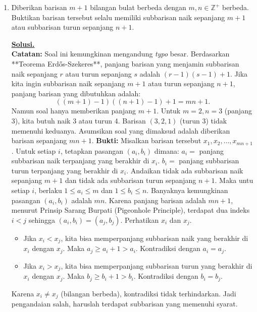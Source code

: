 \documentclass[12pt,twoside]{article}
\newenvironment{solution}
{
	\par\noindent\textbf{\underline{Solusi.}}\\
}
{
	\par
}
\begin{document}
\begin{enumerate}
  \item Diberikan barisan $m+1$ bilangan bulat berbeda dengan $m,n \in \mathbb{Z}^+$ berbeda.
        Buktikan barisan tersebut selalu memiliki subbarisan naik sepanjang $m+1$ atau subbarisan turun sepanjang $n+1$.
        \begin{solution}
          \textbf{Catatan:} Soal ini kemungkinan mengandung \textit{typo} besar.
          Berdasarkan **Teorema Erd\H{o}s-Szekeres**, panjang barisan yang menjamin subbarisan naik sepanjang $r$ atau turun sepanjang $s$ adalah $(r-1)(s-1) + 1$.
          Jika kita ingin subbarisan naik sepanjang $m+1$ atau turun sepanjang $n+1$, panjang barisan yang dibutuhkan adalah:
          \[ ((m+1)-1)((n+1)-1) + 1 = mn + 1. \]
          Namun soal hanya memberikan panjang $m+1$. Untuk $m=2, n=3$ (panjang 3), kita butuh naik 3 atau turun 4. Barisan $(3,2,1)$ (turun 3) tidak memenuhi keduanya.
          Asumsikan soal yang dimaksud adalah diberikan barisan sepanjang $mn+1$.
          \textbf{Bukti:}
          Misalkan barisan tersebut $x_1, x_2, \dots, x_{mn+1}$.
          Untuk setiap $i$, tetapkan pasangan $(a_i, b_i)$ dimana:
          $a_i =$ panjang subbarisan naik terpanjang yang berakhir di $x_i$.
          $b_i =$ panjang subbarisan turun terpanjang yang berakhir di $x_i$.
          Andaikan tidak ada subbarisan naik sepanjang $m+1$ dan tidak ada subbarisan turun sepanjang $n+1$.
          Maka untu setiap $i$, berlaku $1 \le a_i \le m$ dan $1 \le b_i \le n$.
          Banyaknya kemungkinan pasangan $(a_i, b_i)$ adalah $mn$.
          Karena panjang barisan adalah $mn+1$, menurut Prinsip Sarang Burpati (Pigeonhole Principle), terdapat dua indeks $i < j$ sehingga $(a_i, b_i) = (a_j, b_j)$.
          Perhatikan $x_i$ dan $x_j$.
          \begin{itemize}
            \item Jika $x_i < x_j$, kita bisa memperpanjang subbarisan naik yang berakhir di $x_i$ dengan $x_j$. Maka $a_j \ge a_i + 1 > a_i$. Kontradiksi dengan $a_i = a_j$.
            \item Jika $x_i > x_j$, kita bisa memperpanjang subbarisan turun yang berakhir di $x_i$ dengan $x_j$. Maka $b_j \ge b_i + 1 > b_i$. Kontradiksi dengan $b_i = b_j$.
          \end{itemize}
          Karena $x_i \ne x_j$ (bilangan berbeda), kontradiksi tidak terhindarkan.
          Jadi pengandaian salah, haruslah terdapat subbarisan yang memenuhi syarat.
        \end{solution}
\end{enumerate}
\pagebreak
\end{document}

